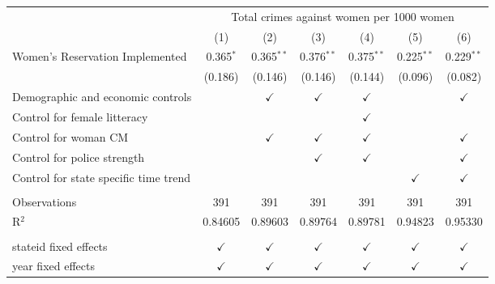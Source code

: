 
\begingroup
\centering
\begin{tabular}{lcccccc}
   \toprule
    & \multicolumn{6}{c}{Total crimes against women per 1000 women}\\
                                         & (1)           & (2)           & (3)           & (4)           & (5)           & (6)\\  
   \midrule 
   Women's Reservation Implemented       & 0.365$^{*}$   & 0.365$^{**}$  & 0.376$^{**}$  & 0.375$^{**}$  & 0.225$^{**}$  & 0.229$^{**}$\\   
                                         & (0.186)       & (0.146)       & (0.146)       & (0.144)       & (0.096)       & (0.082)\\   
   Demographic and economic controls     &               & $\checkmark$  & $\checkmark$  & $\checkmark$  &               & $\checkmark$\\   
   Control for female litteracy          &               &               &               & $\checkmark$  &               & \\  
   Control for woman CM                  &               & $\checkmark$  & $\checkmark$  & $\checkmark$  &               & $\checkmark$\\   
   Control for police strength           &               &               & $\checkmark$  & $\checkmark$  &               & $\checkmark$\\   
   Control for state specific time trend &               &               &               &               & $\checkmark$  & $\checkmark$\\   
    \\
   Observations                          & 391           & 391           & 391           & 391           & 391           & 391\\  
   R$^2$                                 & 0.84605       & 0.89603       & 0.89764       & 0.89781       & 0.94823       & 0.95330\\  
    \\
   stateid fixed effects                 & $\checkmark$  & $\checkmark$  & $\checkmark$  & $\checkmark$  & $\checkmark$  & $\checkmark$\\   
   year fixed effects                    & $\checkmark$  & $\checkmark$  & $\checkmark$  & $\checkmark$  & $\checkmark$  & $\checkmark$\\   
   \bottomrule
\end{tabular}
\par\endgroup



